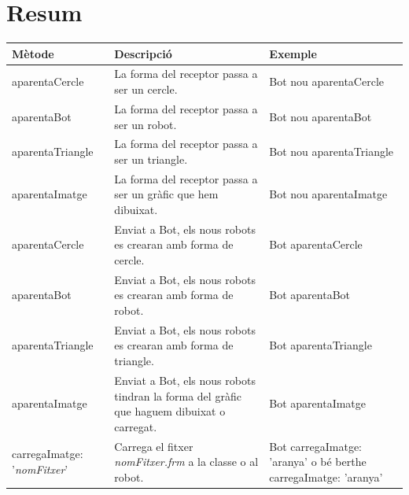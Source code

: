 \section{Resum}
\noindent
{\small \begin{tabular}{p{35mm}p{65mm}p{40mm}}
\hline
\textbf{Mètode} & \textbf{Descripció} & \textbf{Exemple}\\
\hline
\textsf{aparentaCercle} & 
La forma del receptor passa a ser un cercle.
& \textsf{Bot nou aparentaCercle} \\
\textsf{aparentaBot} & 
La forma del receptor passa a ser un robot.
& \textsf{Bot nou aparentaBot} \\
\textsf{aparentaTriangle} & 
La forma del receptor passa a ser un triangle.
& \textsf{Bot nou aparentaTriangle} \\
\textsf{aparentaImatge} & 
La forma del receptor passa a ser un gràfic que hem dibuixat.
& \textsf{Bot nou aparentaImatge} \\
\textsf{aparentaCercle} & 
Enviat a \textsf{Bot}, els nous robots es crearan amb forma de cercle.
& \textsf{Bot aparentaCercle} \\
\textsf{aparentaBot} & 
Enviat a \textsf{Bot}, els nous robots es crearan amb forma de robot.
& \textsf{Bot aparentaBot} \\
\textsf{aparentaTriangle} & 
Enviat a \textsf{Bot}, els nous robots es crearan amb forma de triangle.
& \textsf{Bot aparentaTriangle} \\
\textsf{aparentaImatge} & 
Enviat a \textsf{Bot}, els nous robots tindran la forma del gràfic que haguem dibuixat o carregat.
& \textsf{Bot aparentaImatge} \\
\textsf{carregaImatge: '{\itshape nomFitxer}'} & 
Carrega el fitxer \textsf{{\itshape nomFitxer.frm}} a la classe o al robot.
& \textsf{Bot carregaImatge: 'aranya'} \newline o bé \newline \textsf{berthe carregaImatge: \newline \hspace*{25mm} 'aranya'} \\

\end{tabular}}
